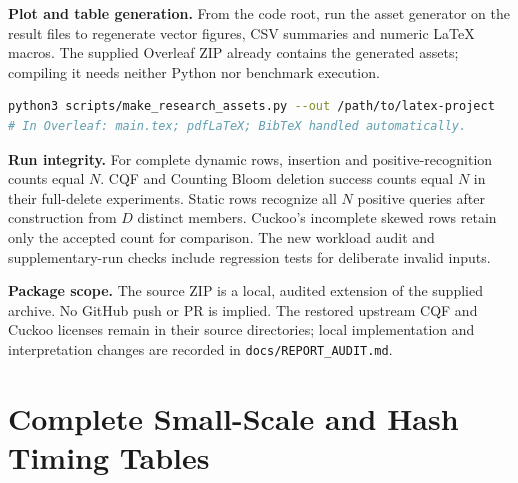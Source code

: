 \textbf{Plot and table generation.} From the code root, run the asset generator on the result files to regenerate vector figures, CSV summaries and numeric LaTeX macros. The supplied Overleaf ZIP already contains the generated assets; compiling it needs neither Python nor benchmark execution.
\begin{lstlisting}[language=bash]
python3 scripts/make_research_assets.py --out /path/to/latex-project
# In Overleaf: main.tex; pdfLaTeX; BibTeX handled automatically.
\end{lstlisting}

\textbf{Run integrity.} For complete dynamic rows, insertion and positive-recognition counts equal $N$. CQF and Counting Bloom deletion success counts equal $N$ in their full-delete experiments. Static rows recognize all $N$ positive queries after construction from $D$ distinct members. Cuckoo's incomplete skewed rows retain only the accepted count for comparison. The new workload audit and supplementary-run checks include regression tests for deliberate invalid inputs.

\textbf{Package scope.} The source ZIP is a local, audited extension of the supplied archive. No GitHub push or PR is implied. The restored upstream CQF and Cuckoo licenses remain in their source directories; local implementation and interpretation changes are recorded in \texttt{docs/REPORT\_AUDIT.md}.
\clearpage

\section{Complete Small-Scale and Hash Timing Tables}
\begin{table}[!htbp]\centering\small
\caption{New 1M-operation seven-filter results. Throughput means are in M/s; final footprint is in decimal MB. Dynamic insertions are measured over $N$ operations. Static build rates, shown in the build column only, use $D$ distinct keys and exclude preparation. Unsupported and incomplete-workload rates are dashes; the skewed Cuckoo row accepts only 24 operations. Full raw repetitions remain in the data files.}
\label{tab:small-full}

\end{table}

\begin{table}[!htbp]\centering\small
\caption{CQF hash study: mean throughput in M/s. The 996k control includes deletion; 67M deletion is omitted by design. Both use three timing repetitions and 10M negatives.}
\label{tab:hash-full}

\end{table}

